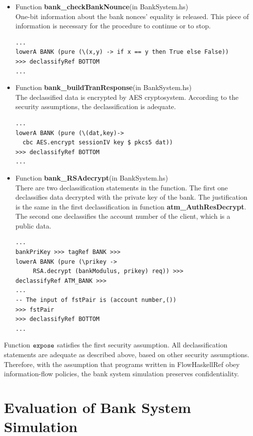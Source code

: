 \documentclass[a4paper]{report}
\newcommand{\co}[1]{$\cod{#1}$}
\begin{document}
\begin{itemize}
\item Function \textbf{bank\_checkBankNounce}(in BankSystem.hs) \\
      One-bit information about the bank nonces' equality is released. This piece of information is
      necessary for the procedure to continue or to stop.
\begin{Verbatim}[fontsize=\footnotesize]
...
lowerA BANK (pure (\(x,y) -> if x == y then True else False)) 
>>> declassifyRef BOTTOM
...
\end{Verbatim}

\item Function \textbf{bank\_buildTranResponse}(in BankSystem.hs) \\
      The declassified data is encrypted by AES cryptosystem. According to the security assumptions, the 
      declassification is adequate.
\begin{Verbatim}[fontsize=\footnotesize]
...
lowerA BANK (pure (\(dat,key)-> 
  cbc AES.encrypt sessionIV key $ pkcs5 dat)) 
>>> declassifyRef BOTTOM
...
\end{Verbatim}

\item Function \textbf{bank\_RSAdecrypt}(in BankSystem.hs) \\
      There are two declassification statements in the function. The first one declassifies data decrypted with the
      private key of the bank. The justification is the same in the first declassification in function
      \textbf{atm\_AuthResDecrypt}. The second one declassifies the account number of the client, which
      is a public data.
\begin{Verbatim}[fontsize=\footnotesize]
...
bankPriKey >>> tagRef BANK >>>
lowerA BANK (pure (\prikey -> 
     RSA.decrypt (bankModulus, prikey) req)) >>>
declassifyRef ATM_BANK >>>
...
-- The input of fstPair is (account number,())
>>> fstPair   
>>> declassifyRef BOTTOM
...
\end{Verbatim}

\end{itemize}

Function \co{expose} satisfies the first security assumption. All declassification statements are adequate 
as described above, based on other security assumptions. Therefore,
with the assumption that programs written in FlowHaskellRef obey information-flow policies, 
the bank system simulation preserves confidentiality.

\section{Evaluation of Bank System Simulation}
\end{document}
